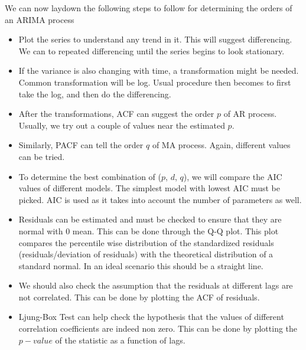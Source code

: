 \documentclass[../../time_series_notes.tex]{subfiles}
\begin{document}
We can now laydown the following steps to follow for determining the orders of an ARIMA process
\begin{itemize}\label{arima_model}
    \item Plot the series to understand any trend in it. This will suggest differencing. We can to repeated differencing until the series begins to look stationary.
    \item If the variance is also changing with time, a transformation might be needed. Common transformation will be log. Usual procedure then becomes to first take the log, and then do the differencing.
    \item After the transformations, ACF can suggest the order $p$ of AR process. Usually, we try out a couple of values near the estimated $p$.
    \item Similarly, PACF can tell the order $q$ of MA process. Again, different values can be tried.
    \item To determine the best combination of ($p$, $d$, $q$), we will compare the AIC values of different models. The simplest model with lowest AIC must be picked. AIC is used as it takes into account the number of parameters as well.
    \item Residuals can be estimated and must be checked to ensure that they are normal with 0 mean. This can be done through the Q-Q plot. This plot compares the percentile wise distribution of the standardized residuals (residuals/deviation of residuals) with the theoretical distribution of a standard normal. In an ideal scenario this should be a straight line.
    \item We should also check the assumption that the residuals at different lags are not correlated. This can be done by plotting the ACF of residuals.
    \item Ljung-Box Test can help check the hypothesis that the values of different correlation coefficients are indeed non zero. This can be done by plotting the $p-value$ of the statistic as a function of lags.
\end{itemize}
\end{document}
